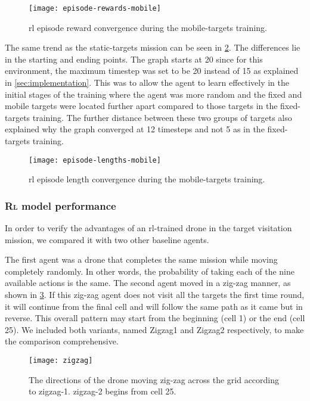 \documentclass[../main.tex]{subfiles}
\begin{document}
\begin{figure}[tbp]
	\centering
	\texttt{[image: episode-rewards-mobile]}
        \caption{\gls{rl} episode reward convergence during the
        mobile-targets training.}
        \label{fig:episode-rewards-mobile}
\end{figure}

The same trend as the static-targets mission can be seen in
\cref{fig:episode-lengths-mobile}.
The differences lie in the starting and ending points.
The graph starts at 20 since for this environment, the maximum
timestep was set to be 20 instead of 15 as explained in
\cref{sec:implementation}.
This was to allow the agent to learn effectively in the initial
stages of the training where the agent was more random and the fixed
and mobile targets were located further apart compared to those targets
in the fixed-targets training.
The further distance between these two groups of targets also explained
why the graph converged at 12 timesteps and not 5 as in the
fixed-targets training.

\begin{figure}[tbp]
	\centering
	\texttt{[image: episode-lengths-mobile]}
        \caption{\gls{rl} episode length convergence during the
        mobile-targets training.}
        \label{fig:episode-lengths-mobile}
\end{figure}

\subsubsection{\textsc{Rl} model performance}

In order to verify the advantages of an \gls{rl}-trained drone
in the target visitation mission, we compared it with
two other baseline agents.

The first agent was a drone that completes the same mission 
while moving completely randomly. 
In other words, the probability of taking each of the 
nine available actions is the same.
The second agent moved in a zig-zag manner, as shown
in \cref{fig:zigzag}.
If this zig-zag agent does not visit all the targets the first time
round, it will continue from the final cell and will follow the same
path as it came but in reverse.
This overall pattern may start from the beginning (cell 1) or 
the end (cell 25).
We included both variants, named Zigzag1 and Zigzag2
respectively, to make the comparison comprehensive.

\begin{figure}[tbp]
	\centering
	\texttt{[image: zigzag]}
	\caption{The directions of the drone moving zig-zag
		across the grid according to zigzag-1.
                zigzag-2 begins from cell 25.}
	\label{fig:zigzag}
\end{figure}
\end{document}
